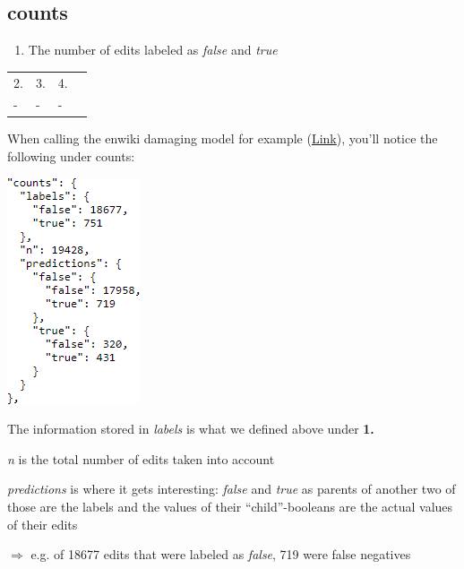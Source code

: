 \documentclass[12pt,a4paper]{article}
\begin{document}
\subsection{counts}
\begin{enumerate}
\item The number of edits labeled as \textit{false} and \textit{true}
\end{enumerate}
\begin{tabular}{|l|l|l|l|}
\hline
2. & 3. & 4.\\ 
- & - & - \\ \hline
\end{tabular}
\begin{description}
\item When calling the enwiki damaging model for example (\href{https://ores.wikimedia.org/v3/scores/enwiki/?models=damaging&model_info=statistics}{Link}), you'll notice the following under counts:
\item \includegraphics[scale=1]{resources/4/enwikiDamagingCounts}
\item The information stored in \textit{labels} is what we defined above under \textbf{1.}
\item \textit{n} is the total number of edits taken into account
\item \textit{predictions} is where it gets interesting: \textit{false} and \textit{true} as parents of another two of those are the labels and the values of their ``child''-booleans are the actual values of their edits
\item $\Rightarrow$ e.g. of 18677 edits that were labeled as \textit{false}, 719 were false negatives
\end{description}
%
\end{document}
